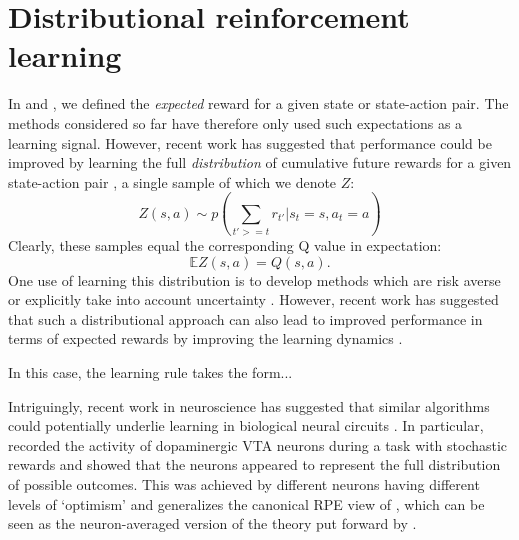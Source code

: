 \section*{Distributional reinforcement learning}
\label{sec:distributional}

In  and , we defined the \emph{expected} reward for a given state or state-action pair.
The methods considered so far have therefore only used such expectations as a learning signal.
However, recent work has suggested that performance could be improved by learning the full \emph{distribution} of cumulative future rewards for a given state-action pair \citep{bellemare2017distributional, bellemare2023distributional,dabney2018distributional}, a single sample of which we denote $Z$:
\begin{equation}
    Z(s, a) \sim p(\sum_{t' >= t} r_{t'} | s_t = s, a_t = a)
\end{equation}
Clearly, these samples equal the corresponding Q value in expectation:
\begin{equation}
    \mathbb{E} Z(s, a) = Q(s, a).
\end{equation}
One use of learning this distribution is to develop methods which are risk averse \citep{morimura2010nonparametric,morimura2010nonparametric} or explicitly take into account uncertainty \citep{dearden1998bayesian}.
However, recent work has suggested that such a distributional approach can also lead to improved performance in terms of expected rewards by improving the learning dynamics \citep{bellemare2017distributional}.

In this case, the learning rule takes the form...

Intriguingly, recent work in neuroscience has suggested that similar algorithms could potentially underlie learning in biological neural circuits \citep{dabney2020distributional,lowet2020distributional}.
In particular, \citet{dabney2020distributional} recorded the activity of dopaminergic VTA neurons during a task with stochastic rewards and showed that the neurons appeared to represent the full distribution of possible outcomes.
This was achieved by different neurons having different levels of `optimism' and generalizes the canonical RPE view of \citet{schultz1997neural}, which can be seen as the neuron-averaged version of the theory put forward by \citet{dabney2020distributional}.

